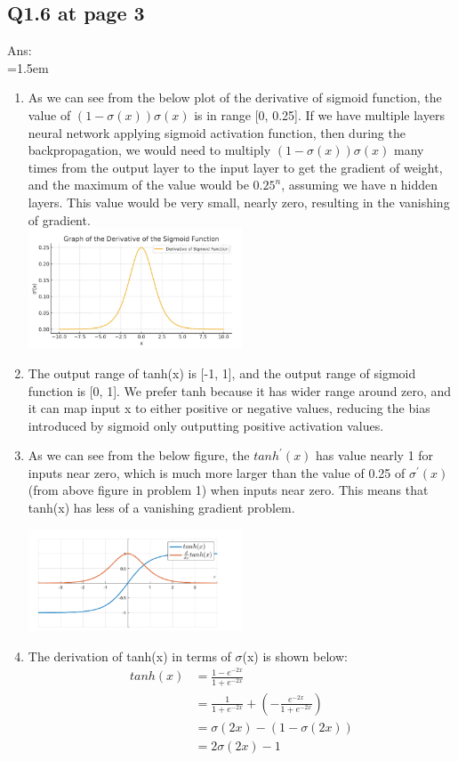 \documentclass{article}
\begin{document}
	\subsection*{Q1.6 at page 3}
	Ans:\\
	\hangindent=1.5em \hspace{1.5em}
	\begin{enumerate}
		\item As we can see from the below plot of the derivative of sigmoid function, the value of $(1-\sigma(x))\sigma(x)$ is in range [0, 0.25]. If we have multiple layers neural network applying sigmoid activation function, then during the backpropagation, we would need to multiply $(1-\sigma(x))\sigma(x)$ many times from the output layer to the input layer to get the gradient of weight, and the maximum of the value would be $0.25^n$, assuming we have n hidden layers. This value would be very small, nearly zero, resulting in the vanishing of gradient.\\
		
		\includegraphics[width=0.5\textwidth]{./Q1_6_plot1.png}
		
		\item The output range of tanh(x) is [-1, 1], and the output range of sigmoid function is [0, 1]. We prefer tanh because it has wider range around zero, and it can map input x to either positive or negative values, reducing the bias introduced by sigmoid only outputting positive activation values.
		\item As we can see from the below figure, the $tanh^{'}(x)$ has value nearly 1 for inputs near zero, which is much more larger than the value of 0.25 of $\sigma^{'}(x)$ (from above figure in problem 1) when inputs near zero. This means that tanh(x) has less of a vanishing gradient problem.
		
		\includegraphics[width=0.5\textwidth]{./Q1_6_plot2.png}
	
		\item The derivation of tanh(x) in terms of $\sigma$(x) is shown below:
		\begin{align}
			tanh(x) &= \frac{1-e^{-2x}}{1+e^{-2x}} \\
			&= \frac{1}{1+e^{-2x}} + (-\frac{e^{-2x}}{1+e^{-2x}}) \\
			&= \sigma(2x) - (1-\sigma(2x))\\
			&= 2\sigma(2x)-1
		\end{align}		
		
	\end{enumerate}	
	
\end{document}
